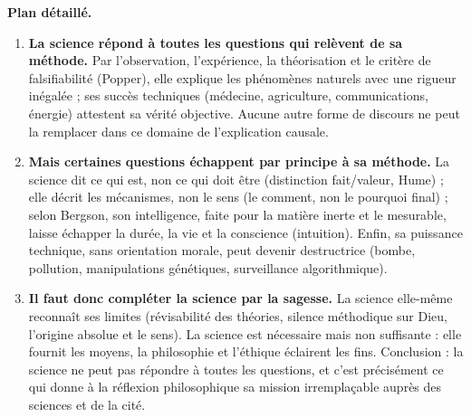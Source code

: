 \documentclass[11pt]{article}
\begin{document}
\begin{exoresolu}
\textbf{Plan détaillé.}
\begin{enumerate}
\item \textbf{La science répond à toutes les questions qui relèvent de sa méthode.} Par l'observation, l'expérience, la théorisation et le critère de falsifiabilité (Popper), elle explique les phénomènes naturels avec une rigueur inégalée ; ses succès techniques (médecine, agriculture, communications, énergie) attestent sa vérité objective. Aucune autre forme de discours ne peut la remplacer dans ce domaine de l'explication causale.
\item \textbf{Mais certaines questions échappent par principe à sa méthode.} La science dit ce qui est, non ce qui doit être (distinction fait/valeur, Hume) ; elle décrit les mécanismes, non le sens (le comment, non le pourquoi final) ; selon Bergson, son intelligence, faite pour la matière inerte et le mesurable, laisse échapper la durée, la vie et la conscience (intuition). Enfin, sa puissance technique, sans orientation morale, peut devenir destructrice (bombe, pollution, manipulations génétiques, surveillance algorithmique).
\item \textbf{Il faut donc compléter la science par la sagesse.} La science elle-même reconnaît ses limites (révisabilité des théories, silence méthodique sur Dieu, l'origine absolue et le sens). La science est nécessaire mais non suffisante : elle fournit les moyens, la philosophie et l'éthique éclairent les fins. Conclusion : la science ne peut pas répondre à toutes les questions, et c'est précisément ce qui donne à la réflexion philosophique sa mission irremplaçable auprès des sciences et de la cité.
\end{enumerate}
\end{exoresolu}
\end{document}
